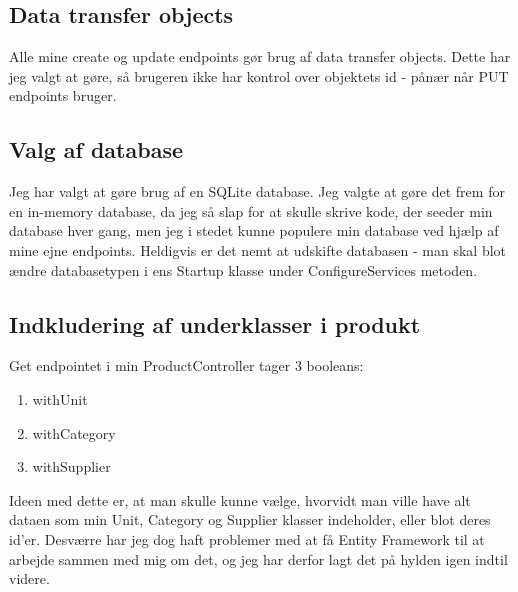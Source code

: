 \documentclass[a4paper]{article}
\begin{document}
\subsection*{Data transfer objects}
Alle mine create og update endpoints gør brug af data transfer objects.
Dette har jeg valgt at gøre, så brugeren ikke har kontrol over objektets id - pånær når PUT endpoints bruger.

\subsection*{Valg af database}
Jeg har valgt at gøre brug af en SQLite database.
Jeg valgte at gøre det frem for en in-memory database, da jeg så slap for at skulle skrive kode, der seeder min database hver gang, men jeg i stedet kunne populere min database ved hjælp af mine ejne endpoints.
Heldigvis er det nemt at udskifte databasen - man skal blot ændre databasetypen i ens Startup klasse under ConfigureServices metoden.

\subsection*{Indkludering af underklasser i produkt}
Get endpointet i min ProductController tager 3 booleans:
\begin{enumerate}
    \item withUnit
    \item withCategory
    \item withSupplier
\end{enumerate}

Ideen med dette er, at man skulle kunne vælge, hvorvidt man ville have alt dataen som min Unit, Category og Supplier klasser indeholder, eller blot deres id'er.
Desværre har jeg dog haft problemer med at få Entity Framework til at arbejde sammen med mig om det, og jeg har derfor lagt det på hylden igen indtil videre.
\end{document}
